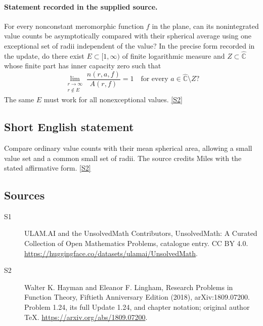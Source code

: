 \documentclass[11pt]{article}
\newcommand{\sref}[2]{\hyperlink{source:#1:#2}{[S#2]}}
\begin{document}
\paragraph{Statement recorded in the supplied source.}
For every nonconstant meromorphic function $f$ in the plane, can its nonintegrated value counts be asymptotically compared with their spherical average using one exceptional set of radii independent of the value? In the precise form recorded in the update, do there exist $E\subset[1,\infty)$ of finite logarithmic measure and $Z\subset\widehat{\mathbb C}$ whose finite part has inner capacity zero such that
\[
 \lim_{\substack{r\to\infty\\r\notin E}}\frac{n(r,a,f)}{A(r,f)}=1
 \quad\text{for every }a\in\widehat{\mathbb C}\setminus Z?
\]
The same $E$ must work for all nonexceptional values. \sref{statement}{2}
\subsection{Short English statement}
Compare ordinary value counts with their mean spherical area, allowing a small value set and a common small set of radii. The source credits Miles with the stated affirmative form. \sref{statement}{2}
\subsection{Sources}
\begin{description}
\item[\hypertarget{source:statement:1}{S1}] ULAM.AI and the UnsolvedMath Contributors, UnsolvedMath: A Curated Collection of Open Mathematics Problems, catalogue entry. CC BY 4.0. \url{https://huggingface.co/datasets/ulamai/UnsolvedMath}.
\item[\hypertarget{source:statement:2}{S2}] Walter K. Hayman and Eleanor F. Lingham, Research Problems in Function Theory, Fiftieth Anniversary Edition (2018), arXiv:1809.07200. Problem 1.24, its full Update 1.24, and chapter notation; original author TeX. \url{https://arxiv.org/abs/1809.07200}.
\end{description}
\label{end:statement}
\end{document}
